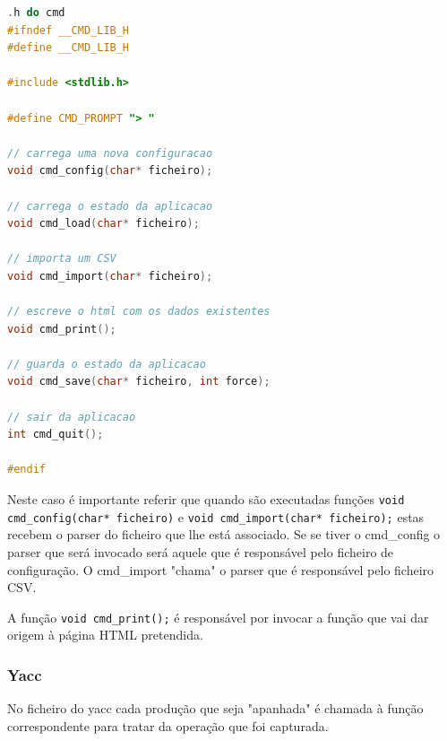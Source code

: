 \documentclass[11pt, a4paper, oneside]{article}
\begin{document}
\begin{lstlisting}[language=C, caption={Construtores do ficheiro de consola.}]
.h do cmd
#ifndef __CMD_LIB_H
#define __CMD_LIB_H

#include <stdlib.h>

#define CMD_PROMPT "> "

// carrega uma nova configuracao
void cmd_config(char* ficheiro);

// carrega o estado da aplicacao
void cmd_load(char* ficheiro);

// importa um CSV
void cmd_import(char* ficheiro);

// escreve o html com os dados existentes
void cmd_print();

// guarda o estado da aplicacao
void cmd_save(char* ficheiro, int force);

// sair da aplicacao
int cmd_quit();

#endif
\end{lstlisting} 

Neste caso é importante referir que quando são executadas funções \texttt{void cmd\_config(char* ficheiro)} e \texttt{void cmd\_import(char* ficheiro);} estas recebem o parser do ficheiro que lhe está associado. Se se tiver o cmd\_config o parser que será invocado será aquele que é responsável pelo ficheiro de configuração. O cmd\_import "chama" o parser que é responsável pelo ficheiro CSV.

A função \texttt{void cmd\_print();} é responsável por invocar a função que vai dar origem à página HTML pretendida.
\subsubsection{\textsf{Yacc}}

No ficheiro do \textsf{yacc} cada produção que seja "apanhada" é chamada à função correspondente para tratar da operação que foi capturada.
\end{document}
